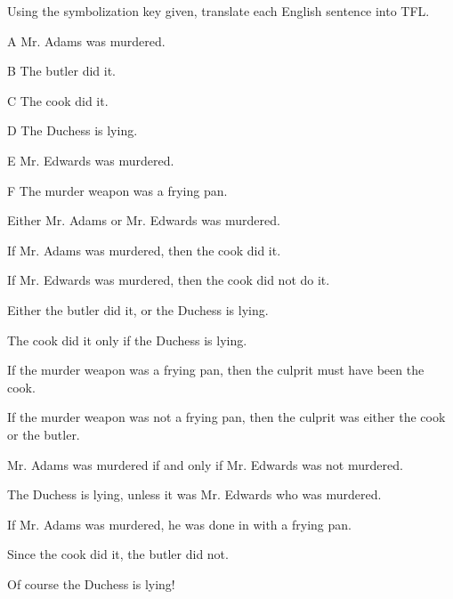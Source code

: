 \problempart Using the symbolization key given, translate each English sentence into TFL.
\begin{ekey}
\item[A] Mr. Adams was murdered.
\item[B] The butler did it.
\item[C] The cook did it.
\item[D] The Duchess is lying.
\item[E] Mr. Edwards was murdered.
\item[F] The murder weapon was a frying pan.
\end{ekey}
\begin{earg}
\item Either Mr. Adams or Mr. Edwards was murdered.
\item If Mr. Adams was murdered, then the cook did it.
\item If Mr. Edwards was murdered, then the cook did not do it.
\item Either the butler did it, or the Duchess is lying.
\item The cook did it only if the Duchess is lying.
\item If the murder weapon was a frying pan, then the culprit must have been the cook.
\item If the murder weapon was not a frying pan, then the culprit was either the cook or the butler.
\item Mr. Adams was murdered if and only if Mr. Edwards was not murdered.
\item The Duchess is lying, unless it was Mr. Edwards who was murdered.
\item If Mr. Adams was murdered, he was done in with a frying pan.
\item Since the cook did it, the butler did not.
\item Of course the Duchess is lying!
\end{earg}


